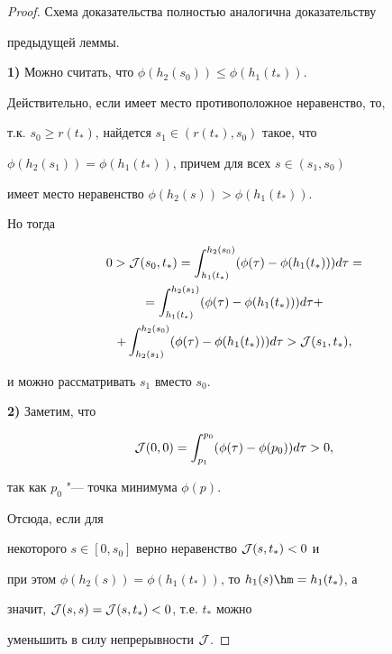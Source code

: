 \begin{proof} Схема доказательства полностью аналогична доказательству

предыдущей леммы.



{\bf 1)} Можно считать, что $\phi(h_2(s_0))\le\phi(h_1(t_*))$.



Действительно, если имеет место противоположное неравенство, то,

т.к. $s_0\ge r(t_*)$,  найдется $s_1\in(r(t_*),s_0)$ такое, что

$\phi(h_2(s_1))=\phi(h_1(t_*))$, причем для всех $s\in(s_1,s_0)$

имеет место неравенство $\phi(h_2(s))>\phi(h_1(t_*))$. 

Но тогда

\begin{multline}

0>{\cal

J}(s_0,t_*)=\int _{h_1(t_*)}^{h_2(s_0)}(\phi(\tau)-\phi(h_1(t_*)))d\tau=

\\

=\int _{h_1(t_*)}^{h_2(s_1)}(\phi(\tau)-\phi(h_1(t_*)))d\tau +\\ +\int _{h_2(s_1)}^{h_2(s_0)}(\phi(\tau)-\phi(h_1(t_*)))d\tau>{\cal

J}(s_1,t_*),

\end{multline}

и можно рассматривать $s_1$ вместо $s_0$.



{\bf 2)} Заметим, что

$$

{\cal

J}(0,0)=\int _{p_1}^{p_0}(\phi(\tau)-\phi(p_0))d\tau>0,

$$

так как $p_0$ "--- точка минимума $\phi(p)$. 

Отсюда, если для 

некоторого $s\in[0,s_0]$ верно неравенство ${\cal J}(s,t_*)<0$ и

при этом $\phi(h_2(s))=\phi(h_1(t_*))$, то $h_1(s)\hm =h_1(t_*)$, а

значит, ${\cal J}(s,s)={\cal J}(s,t_*)<0$, т.е. $t_*$ можно

уменьшить в силу непрерывности ${\cal J}$.






\end{proof}
